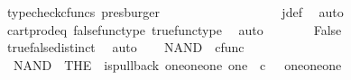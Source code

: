 \begin{isabellebody}
\ {\isacharparenleft}{\kern0pt}typecheck{\isacharunderscore}{\kern0pt}cfuncs{\isacharcomma}{\kern0pt}\ presburger{\isacharparenright}{\kern0pt}\isanewline
\ \ \ \ \isamarkupfalse%
\ \isamarkupfalse%
\ {\isachardoublequoteopen}{\isasymlangle}{\isasymf}{\isacharcomma}{\kern0pt}\ {\isasymt}{\isasymrangle}\ {\isacharequal}{\kern0pt}\ {\isasymlangle}{\isasymt}{\isacharcomma}{\kern0pt}{\isasymt}{\isasymrangle}{\isachardoublequoteclose}\isanewline
\ \ \ \ \ \ \isamarkupfalse%
\ j{\isacharunderscore}{\kern0pt}def\ \isamarkupfalse%
\ auto\isanewline
\ \ \ \ \isamarkupfalse%
\ \isamarkupfalse%
\ {\isachardoublequoteopen}{\isasymt}\ {\isacharequal}{\kern0pt}\ {\isasymf}{\isachardoublequoteclose}\isanewline
\ \ \ \ \ \ \isamarkupfalse%
\ cart{\isacharunderscore}{\kern0pt}prod{\isacharunderscore}{\kern0pt}eq{}\ false{\isacharunderscore}{\kern0pt}func{\isacharunderscore}{\kern0pt}type\ true{\isacharunderscore}{\kern0pt}func{\isacharunderscore}{\kern0pt}type\ \isamarkupfalse%
\ auto\isanewline
\ \ \ \ \isamarkupfalse%
\ \isamarkupfalse%
\ False\isanewline
\ \ \ \ \ \ \isamarkupfalse%
\ true{\isacharunderscore}{\kern0pt}false{\isacharunderscore}{\kern0pt}distinct\ \isamarkupfalse%
\ auto\isanewline
\ \ \isamarkupfalse%
\isanewline
{}\isamarkupfalse%
%
\endisatagproof
{\isafoldproof}%
%
\isadelimproof
%
\endisadelimproof
%
\isadelimdocument
%
\endisadelimdocument
%
\isatagdocument
%
\isamarkuptrue%
%
\endisatagdocument
{\isafolddocument}%
%
\isadelimdocument
%
\endisadelimdocument
{}\isamarkupfalse%
\ NAND\ {\isacharcolon}{\kern0pt}{\isacharcolon}{\kern0pt}\ {\isachardoublequoteopen}cfunc{\isachardoublequoteclose}\ \isanewline
\ \ {\isachardoublequoteopen}NAND\ {\isacharequal}{\kern0pt}\ {\isacharparenleft}{\kern0pt}THE\ {\isasymchi}{\isachardot}{\kern0pt}\ is{\isacharunderscore}{\kern0pt}pullback\ {\isacharparenleft}{\kern0pt}one{\isasymCoprod}{\isacharparenleft}{\kern0pt}one{\isasymCoprod}one{\isacharparenright}{\kern0pt}{\isacharparenright}{\kern0pt}\ one\ {\isacharparenleft}{\kern0pt}{\isasymOmega}\ {\isasymtimes}\isactrlsub c\ {\isasymOmega}{\isacharparenright}{\kern0pt}\ {\isasymOmega}\ {\isacharparenleft}{\kern0pt}{\isasymbeta}\isactrlbsub {\isacharparenleft}{\kern0pt}one{\isasymCoprod}{\isacharparenleft}{\kern0pt}one{\isasymCoprod}one{\isacharparenright}{\kern0pt}{\isacharparenright}{\kern0pt}\isactrlesub {\isacharparenright}{\kern0pt}\ {\isasymt}\ {\isacharparenleft}{\kern0pt}{\isasymlangle}{\isasymf}{\isacharcomma}{\kern0pt}\ {\isasymf}{\isasymrangle}{\isasymamalg}\ {\isacharparenleft}{\kern0pt}{\isasymlangle}{\isasymt}{\isacharcomma}{\kern0pt}\ {\isasymf}{\isasymrangle}\ {\isasymamalg}{\isasymlangle}{\isasymf}{\isacharcomma}{\kern0pt}\ {\isasymt}{\isasymrangle}{\isacharparenright}{\kern0pt}{\isacharparenright}{\kern0pt}\ {\isasymchi}{\isacharparenright}{\kern0pt}{\isachardoublequoteclose}\isanewline

\end{isabellebody}
